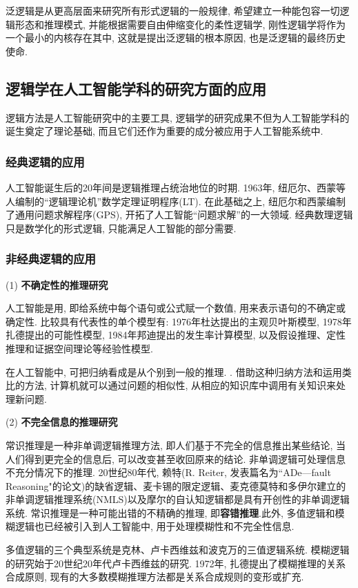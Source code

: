 泛逻辑是从更高层面来研究所有形式逻辑的一般规律, 希望建立一种能包容一切逻辑形态和推理模式, 并能根据需要自由伸缩变化的柔性逻辑学, 刚性逻辑学将作为一个最小的内核存在其中, 这就是提出泛逻辑的根本原因, 也是泛逻辑的最终历史使命.
\subsection{逻辑学在人工智能学科的研究方面的应用}

逻辑方法是人工智能研究中的主要工具, 逻辑学的研究成果不但为人工智能学科的诞生奠定了理论基础, 而且它们还作为重要的成分被应用于人工智能系统中.
\subsubsection{经典逻辑的应用}

人工智能诞生后的20年间是逻辑推理占统治地位的时期. 1963年, 纽厄尔、西蒙等人编制的“逻辑理论机”数学定理证明程序(LT). 在此基础之上, 纽厄尔和西蒙编制了通用问题求解程序(GPS), 开拓了人工智能“问题求解”的一大领域. 经典数理逻辑只是数学化的形式逻辑, 只能满足人工智能的部分需要.
\subsubsection{非经典逻辑的应用}

(1) \textbf{不确定性的推理研究}

人工智能是用, 即给系统中每个语句或公式赋一个数值, 用来表示语句的不确定或确定性. 比较具有代表性的单个模型有: 1976年杜达提出的主观贝叶斯模型, 1978年扎德提出的可能性模型, 1984年邦迪提出的发生率计算模型, 以及假设推理、定性推理和证据空间理论等经验性模型.

在人工智能中, 可把归纳看成是从个别到一般的推理. .
借助这种归纳方法和运用类比的方法, 计算机就可以通过问题的相似性, 从相应的知识库中调用有关知识来处理新问题.

(2) \textbf{不完全信息的推理研究}

常识推理是一种非单调逻辑推理方法, 即人们基于不完全的信息推出某些结论, 当人们得到更完全的信息后, 可以改变甚至收回原来的结论. 非单调逻辑可处理信息不充分情况下的推理.
20世纪80年代, 赖特(R. Reiter, 发表篇名为``ADe—fault  Reasoning"的论文)的缺省逻辑、麦卡锡的限定逻辑、麦克德莫特和多伊尔建立的非单调逻辑推理系统(NMLS)以及摩尔的自认知逻辑都是具有开创性的非单调逻辑系统.
常识推理是一种可能出错的不精确的推理, 即\textbf{容错推理}.此外, 多值逻辑和模糊逻辑也已经被引入到人工智能中, 用于处理模糊性和不完全性信息.
\begin{remark}
    多值逻辑的三个典型系统是克林、卢卡西维兹和波克万的三值逻辑系统. 模糊逻辑的研究始于20世纪20年代卢卡西维兹的研究. 1972年, 扎德提出了模糊推理的关系合成原则, 现有的大多数模糊推理方法都是关系合成规则的变形或扩充.
\end{remark}
